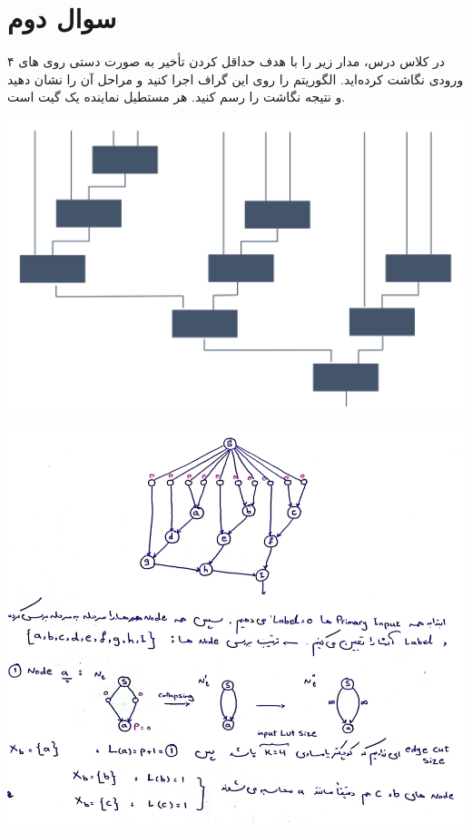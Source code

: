 \section{سوال دوم}




در کلاس درس، مدار زیر را با هدف حداقل کردن تأخیر به صورت دستی روی های ۴ ورودی نگاشت کرده‌اید. الگوریتم  را روی این گراف اجرا کنید و مراحل آن را نشان دهید و نتیجه نگاشت را رسم کنید. هر مستطیل نماینده یک گیت است.


\begin{center}
	\includegraphics*[width=0.7\linewidth]{pics/img1.png}
	\label{شکل سوال ۲}
\end{center}


\begin{qsolve}
	\begin{center}
		\includegraphics*[width=0.8\linewidth]{pics/img6.png}
	\end{center}
\end{qsolve}
\newpage

